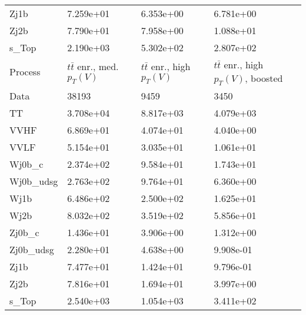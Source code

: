 \begin{table}
{\begin{tabularx}{0.8\textwidth}{|X|X|X|X|}
Zj1b & 7.259e+01 & 6.353e+00 & 6.781e+00 \\
Zj2b & 7.790e+01 & 7.958e+00 & 1.088e+01 \\
s\_Top & 2.190e+03 & 5.302e+02 & 2.807e+02 \\
\hline
\hline
Process & $t\bar{t}$ enr., med. $p_{T}(V)$ & $t\bar{t}$ enr., high $p_{T}(V)$ & $t\bar{t}$ enr., high $p_{T}(V)$, boosted \\
\hline
Data & 38193 & 9459 & 3450 \\
\hline
TT & 3.708e+04 & 8.817e+03 & 4.079e+03 \\
VVHF & 6.869e+01 & 4.074e+01 & 4.040e+00 \\
VVLF & 5.154e+01 & 3.035e+01 & 1.061e+01 \\
Wj0b\_c & 2.374e+02 & 9.584e+01 & 1.743e+01 \\
Wj0b\_udsg & 2.763e+02 & 9.764e+01 & 6.360e+00 \\
Wj1b & 6.486e+02 & 2.500e+02 & 1.625e+01 \\
Wj2b & 8.032e+02 & 3.519e+02 & 5.856e+01 \\
Zj0b\_c & 1.436e+01 & 3.906e+00 & 1.312e+00 \\
Zj0b\_udsg & 2.280e+01 & 4.638e+00 & 9.908e-01 \\
Zj1b & 7.477e+01 & 1.424e+01 & 9.796e-01 \\
Zj2b & 7.816e+01 & 1.694e+01 & 3.997e+00 \\
s\_Top & 2.540e+03 & 1.054e+03 & 3.411e+02 \\
\hline
\end{tabularx}
}
\label{tab:cr-Wen-2016}
\end{table}


